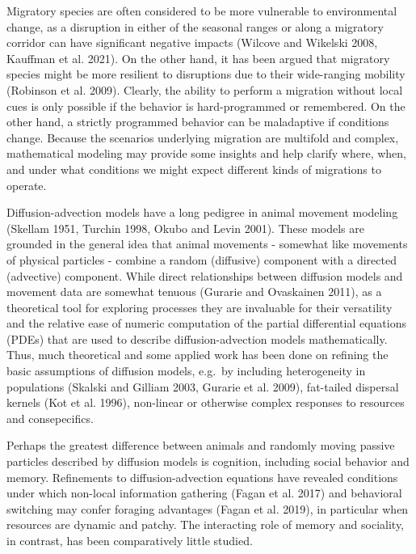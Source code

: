 \documentclass[12pt]{article}
\begin{document}
Migratory species are often considered to be more vulnerable to
environmental change, as a disruption in either of the seasonal ranges
or along a migratory corridor can have significant negative impacts
(Wilcove and Wikelski 2008, Kauffman et al. 2021). On the other hand, it
has been argued that migratory species might be more resilient to
disruptions due to their wide-ranging mobility (Robinson et al. 2009).
Clearly, the ability to perform a migration without local cues is only
possible if the behavior is hard-programmed or remembered. On the other
hand, a strictly programmed behavior can be maladaptive if conditions
change. Because the scenarios underlying migration are multifold and
complex, mathematical modeling may provide some insights and help
clarify where, when, and under what conditions we might expect different
kinds of migrations to operate.

Diffusion-advection models have a long pedigree in animal movement
modeling (Skellam 1951, Turchin 1998, Okubo and Levin 2001). These
models are grounded in the general idea that animal movements - somewhat
like movements of physical particles - combine a random (diffusive)
component with a directed (advective) component. While direct
relationships between diffusion models and movement data are somewhat
tenuous (Gurarie and Ovaskainen 2011), as a theoretical tool for
exploring processes they are invaluable for their versatility and the
relative ease of numeric computation of the partial differential
equations (PDEs) that are used to describe diffusion-advection models
mathematically. Thus, much theoretical and some applied work has been
done on refining the basic assumptions of diffusion models, e.g.~by
including heterogeneity in populations (Skalski and Gilliam 2003,
Gurarie et al. 2009), fat-tailed dispersal kernels (Kot et al. 1996),
non-linear or otherwise complex responses to resources and
consepecifics.

Perhaps the greatest difference between animals and randomly moving
passive particles described by diffusion models is cognition, including
social behavior and memory. Refinements to diffusion-advection equations
have revealed conditions under which non-local information gathering
(Fagan et al. 2017) and behavioral switching may confer foraging
advantages (Fagan et al. 2019), in particular when resources are dynamic
and patchy. The interacting role of memory and sociality, in contrast,
has been comparatively little studied.
\end{document}
